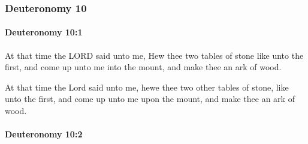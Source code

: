 	\subsubsection{Deuteronomy 10} %
		\label{DEUTERONOMY-10}

		\paragraph{Deuteronomy 10:1} %
			\label{DEUTERONOMY-10-1}

			At that time the LORD said unto me, Hew thee two tables of stone like unto the first, and come up unto me into the mount, and make thee an ark of wood.

			\begin{framed}
			\scriptsize
				\begin{compactdesc}
					\item[OTR2] At that time the Lord said unto me, hewe thee two other tables of stone, like unto the first, and come up unto me upon the mount, and make thee an ark of wood.
				\end{compactdesc}
			\end{framed}

		\paragraph{Deuteronomy 10:2} %
			\label{DEUTERONOMY-10-2}

